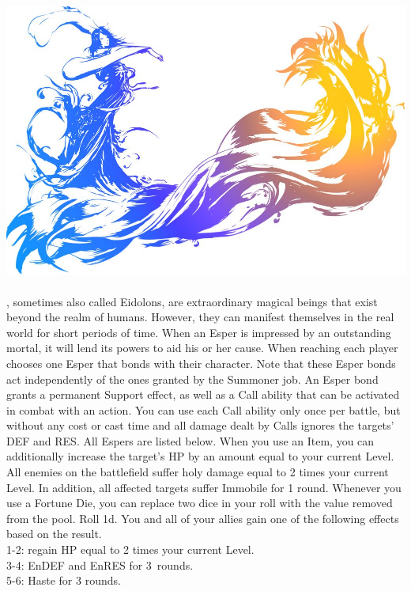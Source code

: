 %
\\\\
%
\includegraphics[width=\columnwidth]{./art/images/ff10.jpg}\\\\
%
, sometimes also called Eidolons, are extraordinary magical beings that exist beyond the realm of humans.
However, they can manifest themselves in the real world for short periods of time.
When an Esper is impressed by an outstanding mortal, it will lend its powers to aid his or her cause.
When reaching  each player chooses one Esper that bonds with their character.
Note that these Esper bonds act independently of the ones granted by the Summoner job.
An Esper bond grants a permanent Support effect, as well as a Call ability that can be activated in combat with an action. 
You can use each Call ability only once per battle, but without any cost or cast time and all damage dealt by Calls ignores the targets' DEF and RES.
All Espers are listed below.
%
\vfill
%
{When you use an Item, you can additionally increase the target's HP by an amount equal to your current Level.}
{All enemies on the battlefield suffer holy damage equal to 2 times your current Level. In addition, all affected targets suffer Immobile for 1 round.}
%
\vfill
%
{Whenever you use a Fortune Die, you can replace two dice in your roll with the value removed from the pool.}
{Roll 1d. You and all of your allies gain one of the following effects based on the result.\\ 1-2: regain HP equal to 2 times your current Level.\\ 3-4: EnDEF and EnRES for 3~rounds.\\ 5-6: Haste for 3 rounds.}
